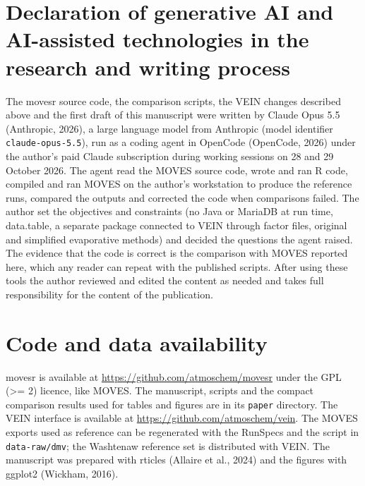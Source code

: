 \documentclass[preprint,
3p]{elsarticle} %
\begin{document}
\section{\texorpdfstring{Declaration of generative AI and AI-assisted
technologies in the research and writing process
\label{sec:ai}}{Declaration of generative AI and AI-assisted technologies in the research and writing process }}\label{declaration-of-generative-ai-and-ai-assisted-technologies-in-the-research-and-writing-process}

The movesr source code, the comparison scripts, the VEIN changes
described above and the first draft of this manuscript were written by
Claude Opus 5.5 (Anthropic, 2026), a large language model from Anthropic
(model identifier \texttt{claude-opus-5.5}), run as a coding agent in
OpenCode (OpenCode, 2026) under the author's paid Claude subscription
during working sessions on 28 and 29 October 2026. The agent read the
MOVES source code, wrote and ran R code, compiled and ran MOVES on the
author's workstation to produce the reference runs, compared the outputs
and corrected the code when comparisons failed. The author set the
objectives and constraints (no Java or MariaDB at run time, data.table,
a separate package connected to VEIN through factor files, original and
simplified evaporative methods) and decided the questions the agent
raised. The evidence that the code is correct is the comparison with
MOVES reported here, which any reader can repeat with the published
scripts. After using these tools the author reviewed and edited the
content as needed and takes full responsibility for the content of the
publication.

\section{Code and data availability}\label{code-and-data-availability}

movesr is available at \url{https://github.com/atmoschem/movesr} under
the GPL (\textgreater= 2) licence, like MOVES. The manuscript, scripts
and the compact comparison results used for tables and figures are in
its \texttt{paper} directory. The VEIN interface is available at
\url{https://github.com/atmoschem/vein}. The MOVES exports used as
reference can be regenerated with the RunSpecs and the script in
\texttt{data-raw/dmv}; the Washtenaw reference set is distributed with
VEIN. The manuscript was prepared with rticles (Allaire et al., 2024)
and the figures with ggplot2 (Wickham, 2016).
\end{document}

